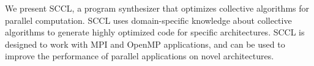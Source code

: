 We present SCCL, a program synthesizer that optimizes collective
algorithms for parallel computation. SCCL uses domain-specific
knowledge about collective algorithms to generate highly optimized
code for specific architectures. SCCL is designed to work with MPI and
OpenMP applications, and can be used to improve the performance of
parallel applications on novel architectures.






\begin{comment}


The rapid evolution of computer hardware introduces novel
architectures that demand efficient utilization for optimal performance.
These innovative architectures enhance the capabilities of processors,
enabling them to perform more complex tasks and improve overall efficiency.
%
For example, GPUs achieve high performance by utilizing specialized hardware
features specifically designed to optimize parallel processing and
computational tasks, and the Vector Processing Units (VPUs) within CPUs
are designed to handle vector operations efficiently,
making them particularly well-suited to applications
 such as video encoding, compression,
and image processing applications.
%
These cutting-edge new architectures are gathering significant interest
from software developers and researchers.

Programs running on top of these new architectures are either
optimized manually by human experts, or optimized by optimizing compilers.
However, both approaches struggle to keep pace
with innovations in architecture, as
the features in those new architectures may not be fully supported
or understood by existing compilers and experts;
%
additionally, optimizing compilers and experts usually rely on heuristics
to determine the best optimization strategies.
%
These heuristics might not be tailored to the specific features
of novel architectures, leading to suboptimal performance.
%
Consequently, efficiently optimizing programs for new architectures remains
a challenging endeavor.

Program synthesis is a promising approach to address the challenge.
%
At its core, program synthesis searches for programs
that meet a specified set of requirements.
%
Nowadays, the advances in SMT solvers and increased computation power
have made program synthesis a more viable choice for code generation.
%
There are several reasons why program synthesis can help address the challenge:

\begin{itemize}
\item \textbf{Adaptability}: Unlike optimizing compilers or human experts,
program synthesis can generate code specifically tailored to the
target architecture.
For example, in superoptimizers,
once the semantics of an instruction is fed into the refinement checker,
it can automatically generate code that takes advantage of the instruction.


\end{comment}
